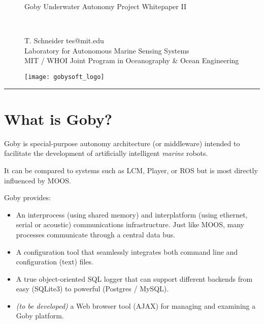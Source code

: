\documentclass[11pt, letterpaper]{article}
\begin{document}
\begin{figure}[H]
\begin{minipage}[b]{0.55\linewidth}
\begin{Large}
Goby Underwater Autonomy Project Whitepaper II
\end{Large}
\vspace{0.5em}\\
\begin{footnotesize}
T. Schneider tes@mit.edu \\
Laboratory for Autonomous Marine Sensing Systems \\
MIT / WHOI Joint Program in Oceanography \& Ocean Engineering
\end{footnotesize}
\end{minipage}
\hfill
\begin{minipage}[b]{0.3\linewidth}
\begin{flushright}
\texttt{[image: gobysoft\_logo]} 
\end{flushright}
\end{minipage}
\end{figure}

\vspace{0.5em}
\rule{\textwidth}{1pt}
\vspace{0.5em}

\section{What is Goby?}

Goby is special-purpose autonomy architecture (or middleware) intended to facilitate the development of artificially intelligent \textit{marine} robots.

It can be compared to systems such as LCM, Player, or ROS but is most directly influenced by MOOS.

Goby provides:

\begin{itemize}
\item An interprocess (using shared memory) and interplatform (using ethernet, serial or acoustic) communications infrastructure. Just like MOOS, many processes communicate through a central data bus.
\item A configuration tool that seamlessly integrates both command line and configuration (text) files.
\item A true object-oriented SQL logger that can support different backends from easy (SQLite3) to powerful (Postgres / MySQL).
\item \textit{(to be developed)} a Web browser tool (AJAX) for managing and examining a Goby platform.
\end{itemize}
\end{document}
